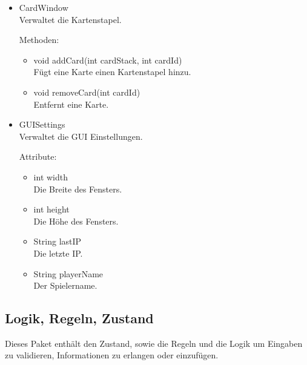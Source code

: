 \documentclass[a4paper,10pt]{article}
\begin{document}
\begin{itemize}
\item CardWindow \\
Verwaltet die Kartenstapel.

Methoden:
\begin{itemize}
\item void addCard(int cardStack, int cardId) \\
Fügt eine Karte einen Kartenstapel hinzu.
\item void removeCard(int cardId) \\
Entfernt eine Karte.
\end{itemize}

\item GUISettings \\
Verwaltet die GUI Einstellungen.

Attribute:
\begin{itemize}
\item int width \\
Die Breite des Fensters.
\item int height \\
Die Höhe des Fensters.
\item String lastIP \\
Die letzte IP.
\item String playerName \\
Der Spielername.
\end{itemize}
\end{itemize}

\subsection{Logik, Regeln, Zustand}

Dieses Paket enthält den Zustand, sowie die Regeln und die Logik um Eingaben zu validieren, Informationen zu erlangen oder einzufügen.
\end{document}
